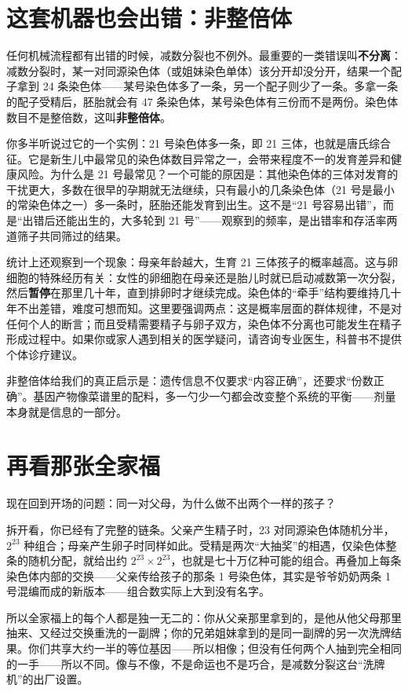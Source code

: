\section{这套机器也会出错：非整倍体}

任何机械流程都有出错的时候，减数分裂也不例外。最重要的一类错误叫\textbf{不分离}：减数分裂时，某一对同源染色体（或姐妹染色单体）该分开却没分开，结果一个配子拿到 24 条染色体——某号染色体多了一条，另一个配子则少了一条。多拿一条的配子受精后，胚胎就会有 47 条染色体，某号染色体有三份而不是两份。染色体数目不是整倍数，这叫\textbf{非整倍体}。

你多半听说过它的一个实例：21 号染色体多一条，即 21 三体，也就是唐氏综合征。它是新生儿中最常见的染色体数目异常之一，会带来程度不一的发育差异和健康风险。为什么是 21 号最常见？一个可能的原因是：其他染色体的三体对发育的干扰更大，多数在很早的孕期就无法继续，只有最小的几条染色体（21 号是最小的常染色体之一）多一条时，胚胎还能发育到出生。这不是“21 号容易出错”，而是“出错后还能出生的，大多轮到 21 号”——观察到的频率，是出错率和存活率两道筛子共同筛过的结果。

统计上还观察到一个现象：母亲年龄越大，生育 21 三体孩子的概率越高。这与卵细胞的特殊经历有关：女性的卵细胞在母亲还是胎儿时就已启动减数第一次分裂，然后\textbf{暂停}在那里几十年，直到排卵时才继续完成。染色体的“牵手”结构要维持几十年不出差错，难度可想而知。这里要强调两点：这是概率层面的群体规律，不是对任何个人的断言；而且受精需要精子与卵子双方，染色体不分离也可能发生在精子形成过程中。如果你或家人遇到相关的医学疑问，请咨询专业医生，科普书不提供个体诊疗建议。

非整倍体给我们的真正启示是：遗传信息不仅要求“内容正确”，还要求“份数正确”。基因产物像菜谱里的配料，多一勺少一勺都会改变整个系统的平衡——剂量本身就是信息的一部分。

\section{再看那张全家福}

现在回到开场的问题：同一对父母，为什么做不出两个一样的孩子？

拆开看，你已经有了完整的链条。父亲产生精子时，23 对同源染色体随机分半，$2^{23}$ 种组合；母亲产生卵子时同样如此。受精是两次“大抽奖”的相遇，仅染色体整条的随机分配，就给出约 $2^{23} \times 2^{23}$，也就是七十万亿种可能的组合。再叠加上每条染色体内部的交换——父亲传给孩子的那条 1 号染色体，其实是爷爷奶奶两条 1 号混编而成的新版本——组合数实际上大到没有名字。

所以全家福上的每个人都是独一无二的：你从父亲那里拿到的，是他从他父母那里抽来、又经过交换重洗的一副牌；你的兄弟姐妹拿到的是同一副牌的另一次洗牌结果。你们共享大约一半的等位基因——所以相像；但没有任何两个人抽到完全相同的一手——所以不同。像与不像，不是命运也不是巧合，是减数分裂这台“洗牌机”的出厂设置。

